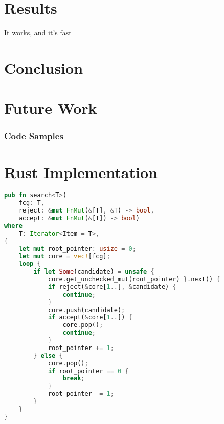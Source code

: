 \documentclass[runningheads]{llncs}
\begin{document}
\section{Results}
It works, and it's fast

\section{Conclusion}

\section{Future Work}





\subsubsection{Code Samples}

\appendix

\section{Rust Implementation}
\begin{lstlisting}[language=Rust, style=boxed]
pub fn search<T>(
	fcg: T,
	reject: &mut FnMut(&[T], &T) -> bool,
	accept: &mut FnMut(&[T]) -> bool)
where
    T: Iterator<Item = T>,
{
    let mut root_pointer: usize = 0;
    let mut core = vec![fcg];
    loop {
        if let Some(candidate) = unsafe {
        	core.get_unchecked_mut(root_pointer) }.next() {
            if reject(&core[1..], &candidate) {
                continue;
            }
            core.push(candidate);
            if accept(&core[1..]) {
                core.pop();
                continue;
            }
            root_pointer += 1;
        } else {
            core.pop();
            if root_pointer == 0 {
                break;
            }
            root_pointer -= 1;
        }
    }
}
\end{lstlisting}
\end{document}
